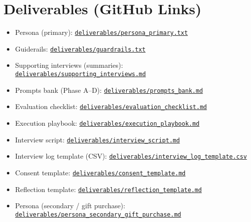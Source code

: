 \documentclass[11pt]{article}
\begin{document}
\section*{Deliverables (GitHub Links)}
\begin{itemize}[leftmargin=1.2em]
  \item Persona (primary): \href{https://github.com/PreFrontalCorporate/assignment-10-chatbot/blob/main/deliverables/persona_primary.txt}{\texttt{deliverables/persona\_primary.txt}}
  \item Guiderails: \href{https://github.com/PreFrontalCorporate/assignment-10-chatbot/blob/main/deliverables/guardrails.txt}{\texttt{deliverables/guardrails.txt}}
  \item Supporting interviews (summaries): \href{https://github.com/PreFrontalCorporate/assignment-10-chatbot/blob/main/deliverables/supporting_interviews.md}{\texttt{deliverables/supporting\_interviews.md}}
  \item Prompts bank (Phase A–D): \href{https://github.com/PreFrontalCorporate/assignment-10-chatbot/blob/main/deliverables/prompts_bank.md}{\texttt{deliverables/prompts\_bank.md}}
  \item Evaluation checklist: \href{https://github.com/PreFrontalCorporate/assignment-10-chatbot/blob/main/deliverables/evaluation_checklist.md}{\texttt{deliverables/evaluation\_checklist.md}}
  \item Execution playbook: \href{https://github.com/PreFrontalCorporate/assignment-10-chatbot/blob/main/deliverables/execution_playbook.md}{\texttt{deliverables/execution\_playbook.md}}
  \item Interview script: \href{https://github.com/PreFrontalCorporate/assignment-10-chatbot/blob/main/deliverables/interview_script.md}{\texttt{deliverables/interview\_script.md}}
  \item Interview log template (CSV): \href{https://github.com/PreFrontalCorporate/assignment-10-chatbot/blob/main/deliverables/interview_log_template.csv}{\texttt{deliverables/interview\_log\_template.csv}}
  \item Consent template: \href{https://github.com/PreFrontalCorporate/assignment-10-chatbot/blob/main/deliverables/consent_template.md}{\texttt{deliverables/consent\_template.md}}
  \item Reflection template: \href{https://github.com/PreFrontalCorporate/assignment-10-chatbot/blob/main/deliverables/reflection_template.md}{\texttt{deliverables/reflection\_template.md}}
  \item Persona (secondary / gift purchase): \href{https://github.com/PreFrontalCorporate/assignment-10-chatbot/blob/main/deliverables/persona_secondary_gift_purchase.md}{\texttt{deliverables/persona\_secondary\_gift\_purchase.md}}

\end{itemize}
\end{document}
